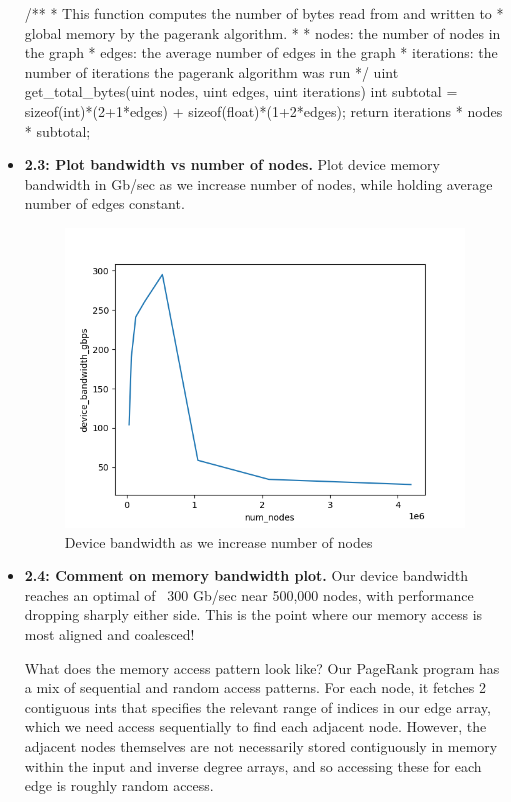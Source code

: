 \documentclass[12pt,letterpaper,twoside]{article}
\begin{document}
\begin{itemize}
\begin{cpp}
/**
* This function computes the number of bytes read from and written to
* global memory by the pagerank algorithm.
* 
* nodes: the number of nodes in the graph
* edges: the average number of edges in the graph
* iterations: the number of iterations the pagerank algorithm was run
*/
uint get_total_bytes(uint nodes, uint edges, uint iterations)
{
    int subtotal = sizeof(int)*(2+1*edges) + sizeof(float)*(1+2*edges);
    return iterations * nodes * subtotal;
}
\end{cpp}

    \item \textbf{2.3: Plot bandwidth vs number of nodes.} Plot device
    memory bandwidth in Gb/sec as we increase number of nodes, while holding
    average number of edges constant.

    \begin{figure}[h]
        \center
        \includegraphics[scale=0.7]{q2_2.png}
        \caption{Device bandwidth as we increase number of nodes}
    \end{figure}

    \item \textbf{2.4: Comment on memory bandwidth plot.} Our device bandwidth 
    reaches an optimal of ~300 Gb/sec near 500,000 nodes, with performance 
    dropping sharply either side. This is the point where our memory access
    is most aligned and coalesced!
    
    What does the memory access pattern look like? Our PageRank program has 
    a mix of sequential and random access patterns. For each node, it fetches
    2 contiguous ints that specifies the relevant range of indices in our 
    edge array, which we need access sequentially to find each adjacent node.
    However, the adjacent nodes themselves are not necessarily stored 
    contiguously in memory within the input and inverse degree arrays, 
    and so accessing these for each edge is roughly random access.


\end{itemize}
\end{document}

